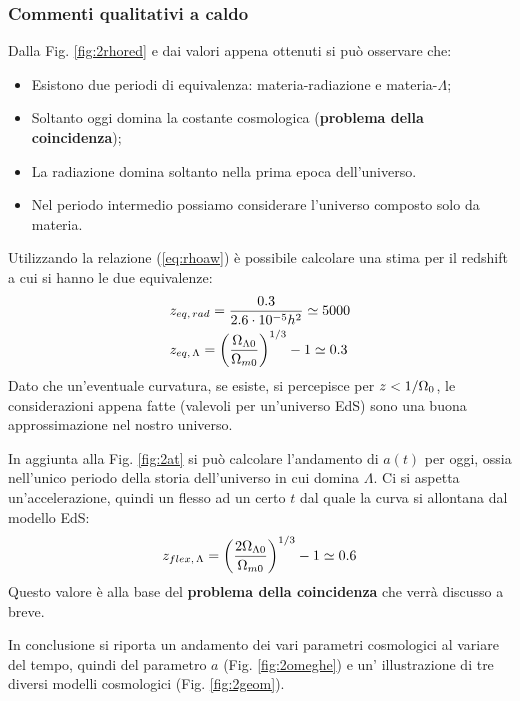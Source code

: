 \subsubsection{Commenti qualitativi a caldo}
Dalla Fig. \ref{fig:2rhored} e dai valori appena ottenuti si può osservare che:
\begin{itemize}
    \item Esistono due periodi di equivalenza: materia-radiazione e materia-$\Lambda$;
    \item Soltanto oggi domina la costante cosmologica (\textbf{problema della coincidenza});
    \item La radiazione domina soltanto nella prima epoca dell'universo.
    \item Nel periodo intermedio possiamo considerare l'universo composto solo da materia.
\end{itemize}

Utilizzando la relazione (\ref{eq:rhoaw}) è possibile calcolare una stima per il redshift a cui si hanno le due equivalenze:
\begin{align}
  & z_{eq,\, rad}=\frac{0.3}{2.6\cdot 10^{-5}h^2} \simeq 5000  \\
  & z_{eq,\, \Lambda}= \left ( \frac{\Omega_{\Lambda 0}}{\Omega_{m0}} \right) ^{1/3} -1 \simeq 0.3  
\end{align}
Dato che un'eventuale curvatura, se esiste, si percepisce per $z<1/\Omega_0$, le considerazioni appena fatte (valevoli per un'universo EdS) sono una buona approssimazione nel nostro universo.

In aggiunta alla Fig. \ref{fig:2at} si può calcolare l'andamento di $a(t)$ per oggi, ossia nell'unico periodo della storia dell'universo in cui domina $\Lambda$. Ci si aspetta un'accelerazione, quindi un flesso ad un certo $t$ dal quale la curva si allontana dal modello EdS:
\begin{equation}
    z_{flex,\, \Lambda}= \left ( \frac{2 \Omega_{\Lambda 0}}{\Omega_{m0}} \right) ^{1/3} -1 \simeq 0.6 
\end{equation}
Questo valore è alla base del \textbf{problema della coincidenza} che verrà discusso a breve.

In conclusione si riporta un andamento dei vari parametri cosmologici al variare del tempo, quindi del parametro $a$ (Fig. \ref{fig:2omeghe}) e un' illustrazione di tre diversi modelli cosmologici (Fig. \ref{fig:2geom}).

